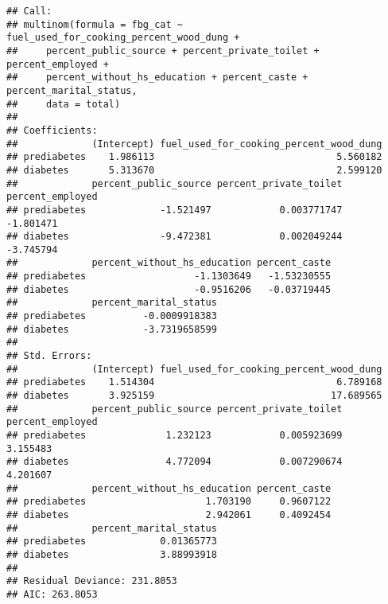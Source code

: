 \documentclass[]{article}
\begin{document}
\begin{verbatim}
## Call:
## multinom(formula = fbg_cat ~ fuel_used_for_cooking_percent_wood_dung + 
##     percent_public_source + percent_private_toilet + percent_employed + 
##     percent_without_hs_education + percent_caste + percent_marital_status, 
##     data = total)
## 
## Coefficients:
##             (Intercept) fuel_used_for_cooking_percent_wood_dung
## prediabetes    1.986113                                5.560182
## diabetes       5.313670                                2.599120
##             percent_public_source percent_private_toilet percent_employed
## prediabetes             -1.521497            0.003771747        -1.801471
## diabetes                -9.472381            0.002049244        -3.745794
##             percent_without_hs_education percent_caste
## prediabetes                   -1.1303649   -1.53230555
## diabetes                      -0.9516206   -0.03719445
##             percent_marital_status
## prediabetes          -0.0009918383
## diabetes             -3.7319658599
## 
## Std. Errors:
##             (Intercept) fuel_used_for_cooking_percent_wood_dung
## prediabetes    1.514304                                6.789168
## diabetes       3.925159                               17.689565
##             percent_public_source percent_private_toilet percent_employed
## prediabetes              1.232123            0.005923699         3.155483
## diabetes                 4.772094            0.007290674         4.201607
##             percent_without_hs_education percent_caste
## prediabetes                     1.703190     0.9607122
## diabetes                        2.942061     0.4092454
##             percent_marital_status
## prediabetes             0.01365773
## diabetes                3.88993918
## 
## Residual Deviance: 231.8053 
## AIC: 263.8053
\end{verbatim}
\end{document}
